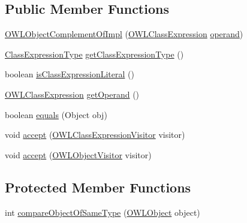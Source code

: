 \subsection*{Public Member Functions}
\begin{DoxyCompactItemize}
\item 
\hyperlink{classuk_1_1ac_1_1manchester_1_1cs_1_1owl_1_1owlapi_1_1_o_w_l_object_complement_of_impl_a33e1b260894ac0a91248faeefa140f26}{O\-W\-L\-Object\-Complement\-Of\-Impl} (\hyperlink{interfaceorg_1_1semanticweb_1_1owlapi_1_1model_1_1_o_w_l_class_expression}{O\-W\-L\-Class\-Expression} \hyperlink{classuk_1_1ac_1_1manchester_1_1cs_1_1owl_1_1owlapi_1_1_o_w_l_object_complement_of_impl_a43b14e506d2ad556bb7b5ade25c9ff84}{operand})
\item 
\hyperlink{enumorg_1_1semanticweb_1_1owlapi_1_1model_1_1_class_expression_type}{Class\-Expression\-Type} \hyperlink{classuk_1_1ac_1_1manchester_1_1cs_1_1owl_1_1owlapi_1_1_o_w_l_object_complement_of_impl_aa6c36a062e73f156fc7946d51cfc5069}{get\-Class\-Expression\-Type} ()
\item 
boolean \hyperlink{classuk_1_1ac_1_1manchester_1_1cs_1_1owl_1_1owlapi_1_1_o_w_l_object_complement_of_impl_a34333498e9832d39b5ffb0b2fda72171}{is\-Class\-Expression\-Literal} ()
\item 
\hyperlink{interfaceorg_1_1semanticweb_1_1owlapi_1_1model_1_1_o_w_l_class_expression}{O\-W\-L\-Class\-Expression} \hyperlink{classuk_1_1ac_1_1manchester_1_1cs_1_1owl_1_1owlapi_1_1_o_w_l_object_complement_of_impl_a2ec42411ccc86c69a1ed441223fe8c75}{get\-Operand} ()
\item 
boolean \hyperlink{classuk_1_1ac_1_1manchester_1_1cs_1_1owl_1_1owlapi_1_1_o_w_l_object_complement_of_impl_ab5ae7544076b85e40fa4475ef64282e6}{equals} (Object obj)
\item 
void \hyperlink{classuk_1_1ac_1_1manchester_1_1cs_1_1owl_1_1owlapi_1_1_o_w_l_object_complement_of_impl_a05fff36febf15ee0237592fd7cd128b5}{accept} (\hyperlink{interfaceorg_1_1semanticweb_1_1owlapi_1_1model_1_1_o_w_l_class_expression_visitor}{O\-W\-L\-Class\-Expression\-Visitor} visitor)
\item 
void \hyperlink{classuk_1_1ac_1_1manchester_1_1cs_1_1owl_1_1owlapi_1_1_o_w_l_object_complement_of_impl_aad9cdb6baf66e21892b13c673aa47ff1}{accept} (\hyperlink{interfaceorg_1_1semanticweb_1_1owlapi_1_1model_1_1_o_w_l_object_visitor}{O\-W\-L\-Object\-Visitor} visitor)
\end{DoxyCompactItemize}
\subsection*{Protected Member Functions}
\begin{DoxyCompactItemize}
\item 
int \hyperlink{classuk_1_1ac_1_1manchester_1_1cs_1_1owl_1_1owlapi_1_1_o_w_l_object_complement_of_impl_a4db409241f92e930db5fc319882e3ca3}{compare\-Object\-Of\-Same\-Type} (\hyperlink{interfaceorg_1_1semanticweb_1_1owlapi_1_1model_1_1_o_w_l_object}{O\-W\-L\-Object} object)
\end{DoxyCompactItemize}
